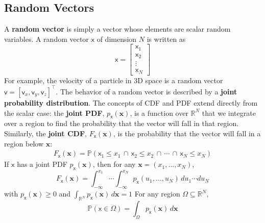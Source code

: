 \subsection{Random Vectors}
A \textbf{random vector} is simply a vector whose elements are scalar random variables. A random vector $\boldsymbol{\mathsf{x}}$ of dimension $N$ is written as
\begin{equation}
    \boldsymbol{\mathsf{x}} = 
    \begin{bmatrix}
        \mathsf{x}_1 \\
        \mathsf{x}_2 \\
        \vdots \\
        \mathsf{x}_N
    \end{bmatrix}
\end{equation}
For example, the velocity of a particle in 3D space is a random vector $\boldsymbol{\mathsf{v}} = [\mathsf{v}_x, \mathsf{v}_y, \mathsf{v}_z]^\top$. The behavior of a random vector is described by a \textbf{joint probability distribution}. The concepts of CDF and PDF extend directly from the scalar case: the \textbf{joint PDF}, $p_{\boldsymbol{\mathsf{x}}}(\mathbf{x})$, is a function over $\mathbb{R}^N$ that we integrate over a region to find the probability that the vector will fall in that region. Similarly, the \textbf{joint CDF}, $F_{\boldsymbol{\mathsf{x}}}(\mathbf{x})$, is the probability that the vector will fall in a region below $\mathbf{x}$:
\begin{align}
  F_{\boldsymbol{\mathsf{x}}}(\mathbf{x})
  = \mathbb{P}\!\left( \mathsf{x}_1 \le x_1 \,\cap\, \mathsf{x}_2 \le x_2 \,\cap\, \cdots \,\cap\, \mathsf{x}_N \le x_N \right)
\end{align}
If $\boldsymbol{\mathsf{x}}$ has a joint PDF $p_{\boldsymbol{\mathsf{x}}}(\mathbf{x})$, then for any $\mathbf{x}=(x_1,\dots,x_N)$,
\begin{equation}
  F_{\boldsymbol{\mathsf{x}}}(\mathbf{x})
  = \int_{-\infty}^{x_1}\!\cdots\!\int_{-\infty}^{x_N}
      p_{\boldsymbol{\mathsf{x}}}(u_1,\dots,u_N)\,du_1\cdots du_N
\end{equation}
with $p_{\boldsymbol{\mathsf{x}}}(\mathbf{x})\ge 0$ and $\int_{\mathbb{R}^N} p_{\boldsymbol{\mathsf{x}}}(\mathbf{x})\,d\mathbf{x}=1$
For any region $\Omega\subseteq\mathbb{R}^N$,
\begin{equation}
  \mathbb{P}(\boldsymbol{\mathsf{x}}\in\Omega)
  = \int_{\Omega} p_{\boldsymbol{\mathsf{x}}}(\mathbf{x})\,d\mathbf{x}
\end{equation}

